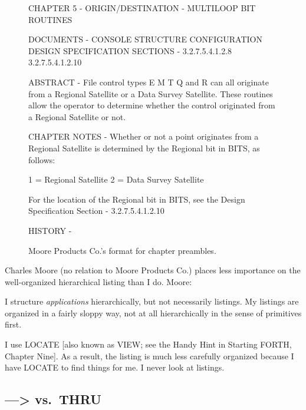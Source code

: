 \begin{figure*}[tttt]
\caption{Moore Products Co.'s format for chapter preambles.}
\begin{Screen}
CHAPTER 5  -  ORIGIN/DESTINATION - MULTILOOP BIT ROUTINES

DOCUMENTS  - CONSOLE STRUCTURE CONFIGURATION
        DESIGN SPECIFICATION
        SECTIONS - 3.2.7.5.4.1.2.8
                   3.2.7.5.4.1.2.10

ABSTRACT - File control types E M T Q and R can all
           originate from a Regional Satellite or a
           Data Survey Satellite.  These routines allow
           the operator to determine whether the control
           originated from a Regional Satellite or not.

\end{Screen}

\begin{Screen}
CHAPTER NOTES - Whether or not a point originates from
                a Regional Satellite is determined by
                the Regional bit in BITS, as follows:

                  1 = Regional Satellite
                  2 = Data Survey Satellite

                 For the location of the Regional bit
                 in BITS, see the Design Specification
                 Section - 3.2.7.5.4.1.2.10

HISTORY  -

\end{Screen}
\end{figure*}
Charles Moore (no relation to Moore Products Co.) places less importance
on the well-organized hierarchical listing than I do.  Moore:
\begin{tfquot}
I structure \emph{applications} hierarchically, but not necessarily listings.  My
listings are organized in a fairly sloppy way, not at all hierarchically in the
sense of primitives first.

I use LOCATE [also known as VIEW; see the Handy Hint in Starting
FORTH, Chapter Nine].  As a result, the listing is much less carefully organized
because I have LOCATE to find things for me.  I never look at listings.
\end{tfquot}
\subsection{--\/--> vs.\ THRU}

